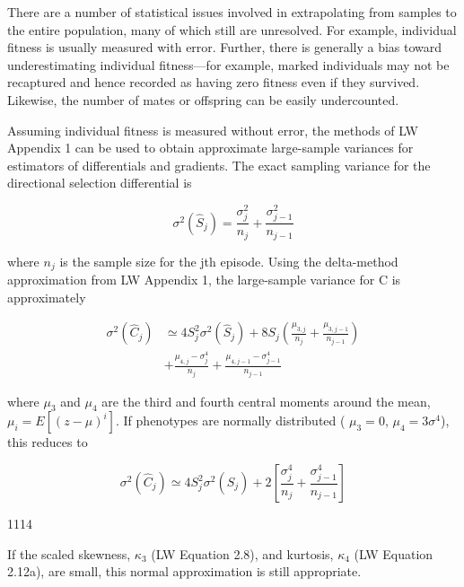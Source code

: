 \documentclass{article}
\begin{document}
There are a number of statistical issues involved in extrapolating from samples to the entire population, many of which still are unresolved. For example, individual fitness is usually measured with error. Further, there is generally a bias toward underestimating individual fitness—for example, marked individuals may not be recaptured and hence recorded as having zero fitness even if they survived. Likewise, the number of mates or offspring can be easily undercounted.

Assuming individual fitness is measured without error, the methods of LW Appendix 1 can be used to obtain approximate large-sample variances for estimators of differentials and gradients. The exact sampling variance for the directional selection differential is

\begin{equation}
\sigma^{2}\left(\widehat{S}_{j}\right)=\frac{\sigma_{j}^{2}}{n_{j}}+\frac{\sigma_{j-1}^{2}}{n_{j-1}}
\tag{29.24a}
\label{eq:29_24a}
\end{equation}

where  $ n_{j} $ is the sample size for the jth episode. Using the delta-method approximation from LW Appendix 1, the large-sample variance for C is approximately

\begin{equation}
\begin{aligned}\sigma^{2}\left(\widehat{C}_{j}\right)&\simeq4S_{j}^{2}\sigma^{2}\left(\widehat{S}_{j}\right)+8S_{j}\left(\frac{\mu_{3,j}}{n_{j}}+\frac{\mu_{3,j-1}}{n_{j-1}}\right)\\&+\frac{\mu_{4,j}-\sigma_{j}^{4}}{n_{j}}+\frac{\mu_{4,j-1}-\sigma_{j-1}^{4}}{n_{j-1}}\end{aligned}
\tag{29.24b}
\label{eq:29_24b}
\end{equation}

where  $ \mu_3 $ and  $ \mu_4 $ are the third and fourth central moments around the mean,  $ \mu_i = E[(z - \mu)^i] $. If phenotypes are normally distributed ( $ \mu_3 = 0 $,  $ \mu_4 = 3\sigma^4 $), this reduces to

\begin{equation}
\sigma^{2}\left(\widehat{C}_{j}\right)\simeq4S_{j}^{2}\sigma^{2}\left(\widehat{S}_{j}\right)+2\left[\frac{\sigma_{j}^{4}}{n_{j}}+\frac{\sigma_{j-1}^{4}}{n_{j-1}}\right]
\tag{29.24c}
\label{eq:29_24c}
\end{equation}

1114

If the scaled skewness,  $ \kappa_3 $ (LW Equation 2.8), and kurtosis,  $ \kappa_4 $ (LW Equation 2.12a), are small, this normal approximation is still appropriate.
\end{document}
